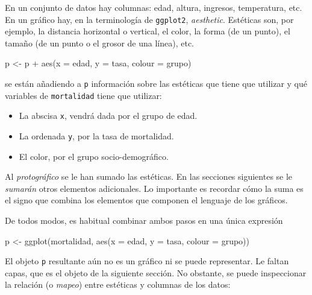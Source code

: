 \documentclass[
]{article}
\newenvironment{Shaded}{\begin{snugshade}}{\end{snugshade}}
\newcommand{\AttributeTok}[1]{\textcolor[rgb]{0.77,0.63,0.00}{#1}}
\newcommand{\FunctionTok}[1]{\textcolor[rgb]{0.00,0.00,0.00}{#1}}
\newcommand{\NormalTok}[1]{#1}
\newcommand{\OtherTok}[1]{\textcolor[rgb]{0.56,0.35,0.01}{#1}}
\newcommand{\SpecialCharTok}[1]{\textcolor[rgb]{0.00,0.00,0.00}{#1}}
\providecommand{\tightlist}{%
  \setlength{\itemsep}{0pt}\setlength{\parskip}{0pt}}
\numberwithin{ejcnt}{section}
\begin{document}
En un conjunto de datos hay columnas: edad, altura, ingresos, temperatura, etc. En un gráfico hay, en la terminología de \texttt{ggplot2}, \emph{aesthetic}. Estéticas son, por ejemplo, la distancia horizontal o vertical, el color, la forma (de un punto), el tamaño (de un punto o el grosor de una línea), etc.

\begin{Shaded}
\begin{Highlighting}[]
\NormalTok{p }\OtherTok{\textless{}{-}}\NormalTok{ p }\SpecialCharTok{+} \FunctionTok{aes}\NormalTok{(}\AttributeTok{x =}\NormalTok{ edad, }\AttributeTok{y =}\NormalTok{ tasa, }\AttributeTok{colour =}\NormalTok{ grupo)}
\end{Highlighting}
\end{Shaded}

se están añadiendo a \texttt{p} información sobre las estéticas que tiene que utilizar y qué variables de \texttt{mortalidad} tiene que utilizar:

\begin{itemize}
\tightlist
\item
  La abscisa \texttt{x}, vendrá dada por el grupo de edad.
\item
  La ordenada \texttt{y}, por la tasa de mortalidad.
\item
  El color, por el grupo socio-demográfico.
\end{itemize}

Al \emph{protográfico} se le han sumado las estéticas. En las secciones siguientes se le \emph{sumarán} otros elementos adicionales. Lo importante es recordar cómo la suma es el signo que combina los elementos que componen el lenguaje de los gráficos.

De todos modos, es habitual combinar ambos pasos en una única expresión

\begin{Shaded}
\begin{Highlighting}[]
\NormalTok{p }\OtherTok{\textless{}{-}} \FunctionTok{ggplot}\NormalTok{(mortalidad, }\FunctionTok{aes}\NormalTok{(}\AttributeTok{x =}\NormalTok{ edad, }\AttributeTok{y =}\NormalTok{ tasa, }\AttributeTok{colour =}\NormalTok{ grupo))}
\end{Highlighting}
\end{Shaded}

El objeto \texttt{p} resultante aún no es un gráfico ni se puede representar. Le faltan capas, que es el objeto de la siguiente sección. No obstante, se puede inspeccionar la relación (o \emph{mapeo}) entre estéticas y columnas de los datos:
\end{document}
